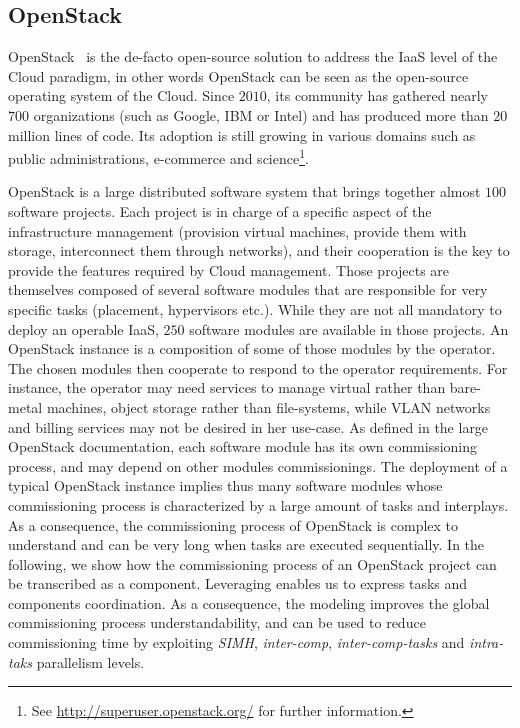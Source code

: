 
\graphicspath{{images/}}

\subsection{OpenStack}
\label{subsec:openstack}

OpenStack~\cite{os:7923796} is the de-facto open-source solution to
address the IaaS level of the Cloud paradigm, in other words OpenStack
can be seen as the open-source operating system of the Cloud. Since
$2010$, its community has gathered nearly $700$ organizations (such as
Google, IBM or Intel) and has produced more than $20$ million lines of
code. Its adoption is still growing in various domains such as public
administrations, e-commerce and science\footnote{See
  \url{http://superuser.openstack.org/} for further information.}.

OpenStack is a large distributed software system that brings together
almost $100$ software projects. Each project is in charge of a
specific aspect of the infrastructure management (\eg provision
virtual machines, provide them with storage, interconnect them through
networks), and their cooperation is the key to provide the features
required by Cloud management.
%
Those projects are themselves composed of several software modules
that are responsible for very specific tasks (\eg placement,
hypervisors etc.). While they are not all mandatory to deploy an
operable IaaS, $250$ software modules are available in those projects.
%
An OpenStack instance is a composition of some of those modules by the
operator. The chosen modules then cooperate to respond to the operator
requirements. For instance, the operator may need services to manage
virtual rather than bare-metal machines, object storage rather than
file-systems, while VLAN networks and billing services may not be
desired in her use-case. As defined in the large OpenStack
documentation, each software module has its own commissioning process,
and may depend on other modules commissionings.
%
The deployment of a typical OpenStack instance implies thus many
software modules whose commissioning process is characterized by a
large amount of tasks and interplays. As a consequence, the
commissioning process of OpenStack is complex to understand and can be
very long when tasks are executed sequentially.
%
In the following, we show how the commissioning process of an
OpenStack project can be transcribed as a \mad component. Leveraging
\mad enables us to express tasks and components coordination. As a
consequence, the \mad modeling improves the global commissioning
process understandability, and can be used to reduce commissioning
time by exploiting \emph{SIMH}, \emph{inter-comp}, \emph{inter-comp-tasks}
and \emph{intra-taks} parallelism levels.

